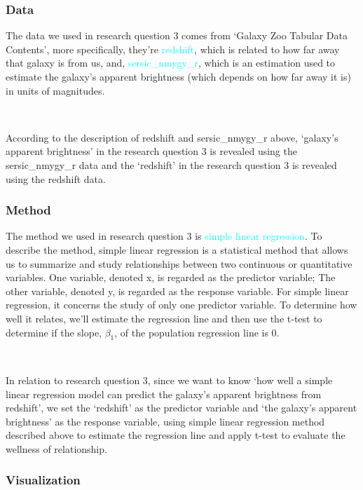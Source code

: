 \documentclass[12pt]{article}
\begin{document}
\subsubsection{Data}

The data we used in research question 3 comes from `Galaxy Zoo Tabular Data Contents', more specifically, they're \textcolor{cyan}{redshift}, which is related to how far away that galaxy is from us, and, \textcolor{cyan}{sersic\_nmygy\_r}, which is an estimation used to estimate the galaxy's apparent brightness (which depends on how far away it is) in units of magnitudes. 

\

\noindent According to the description of redshift and sersic\_nmygy\_r above, `galaxy's apparent brightness' in the research question 3 is revealed using the sersic\_nmygy\_r data and the `redshift' in the research question 3 is revealed using the redshift data.

\subsubsection{Method}

The method we used in research question 3 is \textcolor{cyan}{simple linear regression}. To describe the method, simple linear regression is a statistical method that allows us to summarize and study relationships between two continuous or quantitative variables. One variable, denoted x, is regarded as the predictor variable; The other variable, denoted y, is regarded as the response variable. For simple linear regression, it concerns the study of only one predictor variable. To determine how well it relates, we'll estimate the regression line and then use the t-test to determine if the slope, $\beta_1$, of the population regression line is 0.

\

\noindent In relation to research question 3, since we want to know `how well a simple linear regression model can predict the galaxy's apparent brightness from redshift', we set the `redshift' as the predictor variable and `the galaxy's apparent brightness' as the response variable, using simple linear regression method described above to estimate the regression line and apply t-test to evaluate the wellness of relationship. 

\subsubsection{Visualization}
\end{document}
